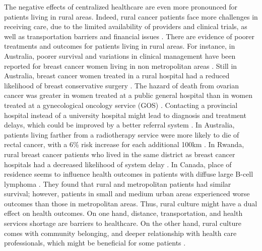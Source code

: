 The negative effects of centralized healthcare are even more pronounced for
patients living in rural areas. Indeed, rural cancer patients face more
challenges in receiving care, due to the limited availability of providers and
clinical trials, as well as transportation barriers and financial issues
\cite{charlton_challenges_2015}. There are evidence of poorer treatments and
outcomes for patients living in rural areas. For instance, in Australia, poorer
survival and variations in clinical management have been reported for breast
cancer women living in non metropolitan areas \cite{dasgupta_variations_2018}.
Still in Australia, breast cancer women treated in a rural hospital had a
reduced likelihood of breast conservative surgery \cite{hall_unequal_2004}.  The
hazard of death from ovarian cancer was greater in women treated at a public
general hospital than in women treated at a gynecological oncology service (GOS)
\cite{tracey_effects_2014}. Contacting a provincial hospital instead of a
university hospital might lead to diagnosis and treatment delays, which could be
improved by a better referral system \cite{thongsuksai_delay_2000}. In
Australia, patients living farther from a radiotherapy service were more likely
to die of rectal cancer, with a 6\% risk increase for each additional 100km
\cite{baade_distance_2011}. In Rwanda, rural breast cancer patients who lived in
the same district as breast cancer hospitals had a decreased likelihood of
system delay \cite{pace_delays_2015}. In Canada, place of residence seems to
influence health outcomes in patients with diffuse large B-cell lymphoma
\cite{lee_effect_2014}. They found that rural and metropolitan patients had
similar survival; however, patients in small and medium urban areas experienced
worse outcomes than those in metropolitan areas. Thus, rural culture might have
a dual effect on health outcomes. On one hand, distance, transportation, and
health services shortage are barriers to healthcare. On the other hand, rural
culture comes with community belonging, and deeper relationship with health care
professionals, which might be beneficial for some patients
\cite{brundisini_chronic_2013}.

